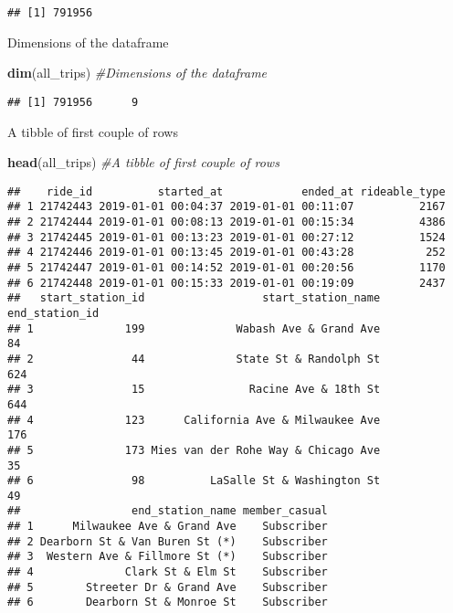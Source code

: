 \documentclass[
]{article}
\newenvironment{Shaded}{\begin{snugshade}}{\end{snugshade}}
\newcommand{\CommentTok}[1]{\textcolor[rgb]{0.56,0.35,0.01}{\textit{#1}}}
\newcommand{\FunctionTok}[1]{\textcolor[rgb]{0.13,0.29,0.53}{\textbf{#1}}}
\newcommand{\NormalTok}[1]{#1}
\begin{document}
\begin{verbatim}
## [1] 791956
\end{verbatim}

Dimensions of the dataframe

\begin{Shaded}
\begin{Highlighting}[]
\FunctionTok{dim}\NormalTok{(all\_trips) }\CommentTok{\#Dimensions of the dataframe}
\end{Highlighting}
\end{Shaded}

\begin{verbatim}
## [1] 791956      9
\end{verbatim}

A tibble of first couple of rows

\begin{Shaded}
\begin{Highlighting}[]
\FunctionTok{head}\NormalTok{(all\_trips) }\CommentTok{\#A tibble of first couple of rows}
\end{Highlighting}
\end{Shaded}

\begin{verbatim}
##    ride_id          started_at            ended_at rideable_type
## 1 21742443 2019-01-01 00:04:37 2019-01-01 00:11:07          2167
## 2 21742444 2019-01-01 00:08:13 2019-01-01 00:15:34          4386
## 3 21742445 2019-01-01 00:13:23 2019-01-01 00:27:12          1524
## 4 21742446 2019-01-01 00:13:45 2019-01-01 00:43:28           252
## 5 21742447 2019-01-01 00:14:52 2019-01-01 00:20:56          1170
## 6 21742448 2019-01-01 00:15:33 2019-01-01 00:19:09          2437
##   start_station_id                  start_station_name end_station_id
## 1              199              Wabash Ave & Grand Ave             84
## 2               44              State St & Randolph St            624
## 3               15                Racine Ave & 18th St            644
## 4              123      California Ave & Milwaukee Ave            176
## 5              173 Mies van der Rohe Way & Chicago Ave             35
## 6               98          LaSalle St & Washington St             49
##                 end_station_name member_casual
## 1      Milwaukee Ave & Grand Ave    Subscriber
## 2 Dearborn St & Van Buren St (*)    Subscriber
## 3  Western Ave & Fillmore St (*)    Subscriber
## 4              Clark St & Elm St    Subscriber
## 5        Streeter Dr & Grand Ave    Subscriber
## 6        Dearborn St & Monroe St    Subscriber
\end{verbatim}
\end{document}
